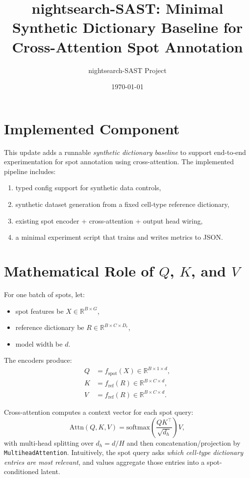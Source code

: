 \documentclass[11pt]{article}
\title{nightsearch-SAST: Minimal Synthetic Dictionary Baseline for Cross-Attention Spot Annotation}
\author{nightsearch-SAST Project}
\date{\today}
\begin{document}
\maketitle

\section{Implemented Component}
This update adds a runnable \emph{synthetic dictionary baseline} to support end-to-end
experimentation for spot annotation using cross-attention. The implemented pipeline includes:
\begin{enumerate}
    \item typed config support for synthetic data controls,
    \item synthetic dataset generation from a fixed cell-type reference dictionary,
    \item existing spot encoder + cross-attention + output head wiring,
    \item a minimal experiment script that trains and writes metrics to JSON.
\end{enumerate}

\section{Mathematical Role of $Q$, $K$, and $V$}
For one batch of spots, let:
\begin{itemize}
    \item spot features be $X \in \mathbb{R}^{B \times G}$,
    \item reference dictionary be $R \in \mathbb{R}^{B \times C \times D_r}$,
    \item model width be $d$.
\end{itemize}

The encoders produce:
\begin{align}
Q &= f_{\text{spot}}(X) \in \mathbb{R}^{B \times 1 \times d},\\
K &= f_{\text{ref}}(R) \in \mathbb{R}^{B \times C \times d},\\
V &= f_{\text{ref}}(R) \in \mathbb{R}^{B \times C \times d}.
\end{align}

Cross-attention computes a context vector for each spot query:
\begin{equation}
\text{Attn}(Q,K,V) = \text{softmax}\left(\frac{QK^\top}{\sqrt{d_h}}\right)V,
\end{equation}
with multi-head splitting over $d_h=d/H$ and then concatenation/projection by
\texttt{MultiheadAttention}. Intuitively, the spot query asks \emph{which cell-type dictionary
entries are most relevant}, and values aggregate those entries into a spot-conditioned latent.
\end{document}
